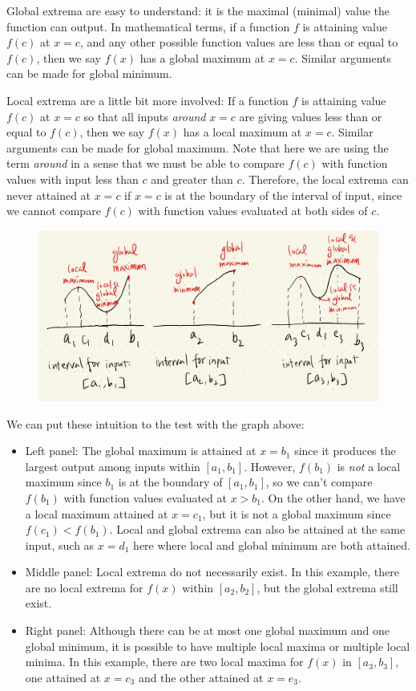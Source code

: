 Global extrema are easy to understand: it is the maximal (minimal) value the function can output.  In mathematical terms, if a function $f$ is attaining value $f(c)$ at $x=c$, and any other possible function values are less than or equal to $f(c)$, then we say $f(x)$ has a global maximum at $x=c$.  Similar arguments can be made for global minimum.  

Local extrema are a little bit more involved: If a function $f$ is attaining value $f(c)$ at $x=c$ so that all inputs \textit{around} $x=c$ are giving values less than or equal to $f(c)$, then we say $f(x)$ has a local maximum at $x=c$.  Similar arguments can be made for global maximum.  Note that here we are using the term \textit{around} in a sense that we must be able to compare $f(c)$ with function values with input less than $c$ and greater than $c$.  Therefore, the local extrema can never attained at $x=c$ if $x=c$ is at the boundary of the interval of input, since we cannot compare $f(c)$ with function values evaluated at both sides of $c$.

\begin{figure}[ht]
    \centering
    \includegraphics[width = \textwidth]{figures/chap 05/extrema.png}
    \label{fig: extrema}
\end{figure}

We can put these intuition to the test with the graph above:
\begin{itemize}
    \item Left panel: The global maximum is attained at $x=b_1$ since it produces the largest output among inputs within $[a_1, b_1]$.  However, $f(b_1)$ is \textit{not} a local maximum since $b_1$ is at the boundary of $[a_1, b_1]$, so we can't compare $f(b_1)$ with function values evaluated at $x > b_1$.  On the other hand, we have a local maximum attained at $x = c_1$, but it is not a global maximum since $f(c_1) < f(b_1)$.  Local and global extrema can also be attained at the same input, such as $x=d_1$ here where local and global minimum are both attained.
    \item Middle panel: Local extrema do not necessarily exist.  In this example, there are no local extrema for $f(x)$ within $[a_2, b_2]$, but the global extrema still exist.
    \item Right panel: Although there can be at most one global maximum and one global minimum, it is possible to have multiple local maxima or multiple local minima.  In this example, there are two local maxima for $f(x)$ in $[a_3, b_3]$, one attained at $x=c_3$ and the other attained at $x = e_3$.
\end{itemize}


